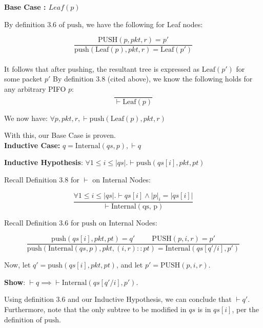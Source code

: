 \documentclass{article}
\begin{document}
\textbf{Base Case : $Leaf(p)$}\newline

By definition 3.6 of $\text{push}$, we have the following for Leaf nodes:

$$\frac{\text{PUSH}(p, pkt, r) = p'}{\text{push}(\text{Leaf}(p), pkt, r) = \text{Leaf}(p')}$$\\[-10pt]

It follows that after pushing, the resultant tree is expressed as $\text{Leaf}(p')$ for some packet $p'$ By definition 3.8 (cited above), we know the following holds for any arbitrary PIFO $p$:\\[-10pt]

$$\frac{}{\vdash \text{Leaf}(p)}$$

We now have: $\forall p, pkt, r, \vdash \text{push}(\text{Leaf}(p), pkt, r)$\newline

With this, our Base Case is proven.\\[10pt]

\textbf{Inductive Case:} $q = \text{Internal}(qs, p), \vdash q$\newline

\textbf{Inductive Hypothesis}: $\forall 1 \leq i \leq |qs|. \vdash \text{push}(qs[i], pkt, pt)$\newline

Recall Definition 3.8 for $\vdash$ on Internal Nodes:

$$\frac{\forall 1 \leq i \leq |qs|. \vdash qs[i] \land |p|_i = |qs[i]|}{\vdash \text{Internal}(\text{qs, p})}$$\newline

Recall Definition 3.6 for $\text{push}$ on Internal Nodes:

$$\frac{\text{push}(qs[i], pkt, pt) = q' \hspace{1cm} \text{PUSH}(p, i, r) = p'}{\text{push}(\text{Internal}(qs, p), pkt, (i, r) :: pt) = \text{Internal}(qs[q'/i], p')}$$\newline

Now, let $q' = \text{push}(qs[i], pkt, pt)$, and let $p' = \text{PUSH}(p, i, r)$.\newline

\textbf{Show}: $\vdash q \implies \vdash \text{Internal}(qs[q'/i], p')$.\newline

Using definition 3.6 and our Inductive Hypothesis, we can conclude that $\vdash q'$. Furthermore, note that the only subtree to be modified in $qs$ is in $qs[i]$, per the definition of $\text{push}$.\newline
\end{document}
